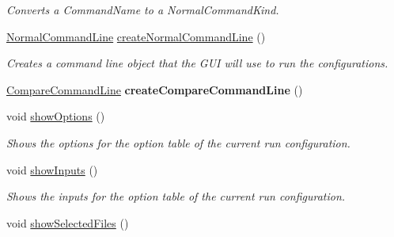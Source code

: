 \begin{DoxyCompactItemize}
\begin{DoxyCompactList}\small\item\em Converts a Command\+Name to a Normal\+Command\+Kind. \end{DoxyCompactList}\item 
\hyperlink{classedu_1_1udel_1_1cis_1_1vsl_1_1civl_1_1run_1_1common_1_1NormalCommandLine}{Normal\+Command\+Line} \hyperlink{classedu_1_1udel_1_1cis_1_1vsl_1_1civl_1_1gui_1_1common_1_1GUI__revamp_a5876ca5e61e9e430f58917df1ea57e2f}{create\+Normal\+Command\+Line} ()
\begin{DoxyCompactList}\small\item\em Creates a command line object that the G\+U\+I will use to run the configurations. \end{DoxyCompactList}\item 
\hypertarget{classedu_1_1udel_1_1cis_1_1vsl_1_1civl_1_1gui_1_1common_1_1GUI__revamp_ac9d2ff28a8aa801f9dd5510dbd1ed18c}{}\hyperlink{classedu_1_1udel_1_1cis_1_1vsl_1_1civl_1_1run_1_1common_1_1CompareCommandLine}{Compare\+Command\+Line} {\bfseries create\+Compare\+Command\+Line} ()\label{classedu_1_1udel_1_1cis_1_1vsl_1_1civl_1_1gui_1_1common_1_1GUI__revamp_ac9d2ff28a8aa801f9dd5510dbd1ed18c}

\item 
\hypertarget{classedu_1_1udel_1_1cis_1_1vsl_1_1civl_1_1gui_1_1common_1_1GUI__revamp_a992dc002e0acb1d9d349a2a4b07e8c66}{}void \hyperlink{classedu_1_1udel_1_1cis_1_1vsl_1_1civl_1_1gui_1_1common_1_1GUI__revamp_a992dc002e0acb1d9d349a2a4b07e8c66}{show\+Options} ()\label{classedu_1_1udel_1_1cis_1_1vsl_1_1civl_1_1gui_1_1common_1_1GUI__revamp_a992dc002e0acb1d9d349a2a4b07e8c66}

\begin{DoxyCompactList}\small\item\em Shows the options for the option table of the current run configuration. \end{DoxyCompactList}\item 
\hypertarget{classedu_1_1udel_1_1cis_1_1vsl_1_1civl_1_1gui_1_1common_1_1GUI__revamp_a6d3a13c6cbc1b493a176acefe6eff478}{}void \hyperlink{classedu_1_1udel_1_1cis_1_1vsl_1_1civl_1_1gui_1_1common_1_1GUI__revamp_a6d3a13c6cbc1b493a176acefe6eff478}{show\+Inputs} ()\label{classedu_1_1udel_1_1cis_1_1vsl_1_1civl_1_1gui_1_1common_1_1GUI__revamp_a6d3a13c6cbc1b493a176acefe6eff478}

\begin{DoxyCompactList}\small\item\em Shows the inputs for the option table of the current run configuration. \end{DoxyCompactList}\item 
\hypertarget{classedu_1_1udel_1_1cis_1_1vsl_1_1civl_1_1gui_1_1common_1_1GUI__revamp_a4a00f3b8bd64513698df6c3125bfa7e0}{}void \hyperlink{classedu_1_1udel_1_1cis_1_1vsl_1_1civl_1_1gui_1_1common_1_1GUI__revamp_a4a00f3b8bd64513698df6c3125bfa7e0}{show\+Selected\+Files} ()\label{classedu_1_1udel_1_1cis_1_1vsl_1_1civl_1_1gui_1_1common_1_1GUI__revamp_a4a00f3b8bd64513698df6c3125bfa7e0}


\end{DoxyCompactItemize}

